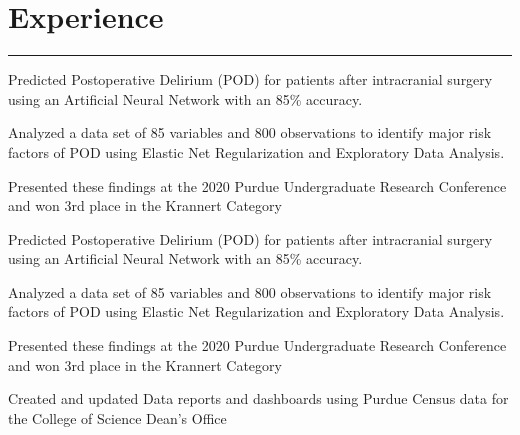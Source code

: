 \documentclass[]{sahana}
\begin{document}
\hfill
\begin{minipage}[t]{0.66\textwidth} 
\vspace{-1pt}
\section{Experience}
\noindent\rule{12.5cm}{0.4pt}
\vspace{-4pt}
\noindent
\begin{tightemize}
\item Predicted Postoperative Delirium (POD) for patients after intracranial surgery using an Artificial Neural Network with an 85\% accuracy.
\item Analyzed a data set of 85 variables and 800 observations to identify major risk factors of POD using Elastic Net Regularization and Exploratory Data Analysis.
\item Presented these findings at the 2020 Purdue Undergraduate Research Conference and won 3rd place in the Krannert Category
\end{tightemize}
\sectionsep

\vspace{-4pt}
\noindent
\begin{tightemize}
\vspace{-5pt}
\item Predicted Postoperative Delirium (POD) for patients after intracranial surgery using an Artificial Neural Network with an 85\% accuracy.
\item Analyzed a data set of 85 variables and 800 observations to identify major risk factors of POD using Elastic Net Regularization and Exploratory Data Analysis.
\item Presented these findings at the 2020 Purdue Undergraduate Research Conference and won 3rd place in the Krannert Category
\end{tightemize}
\sectionsep

\vspace{-4pt}
\noindent
\begin{tightemize}
\vspace{-6pt}
\item Created and updated Data reports and dashboards using Purdue Census data for the College of Science Dean's Office
\end{tightemize}
\sectionsep


\end{minipage}
\end{document}
